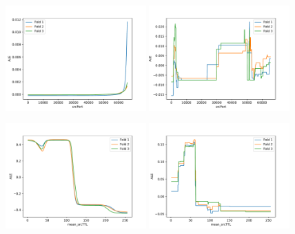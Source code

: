 \documentclass[sigconf,nonacm]{acmart}
\begin{document}
\begin{figure}[p]
\includegraphics[width=0.48\textwidth]{plots/ale/sourceTransportPort_nn.pdf}
\includegraphics[width=0.48\textwidth]{plots/ale/sourceTransportPort_rf.pdf}

\includegraphics[width=0.48\textwidth]{plots/ale/apply(mean(ipTTL),forward)_nn.pdf}
\includegraphics[width=0.48\textwidth]{plots/ale/apply(mean(ipTTL),forward)_rf.pdf}


\end{figure}
\end{document}
